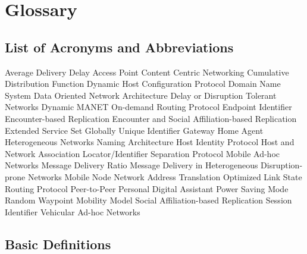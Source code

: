 \chapter{Glossary}

\section{List of Acronyms and Abbreviations}
\begin{description}

 {Average Delivery Delay}
 {Access Point}
 {Content Centric Networking}
 {Cumulative Distribution Function}
 {Dynamic Host Configuration Protocol}
 {Domain Name System}
 {Data Oriented Network Architecture}
 {Delay or Disruption Tolerant Networks}
 {Dynamic MANET On-demand Routing Protocol}
 {Endpoint Identifier}
 {Encounter-based Replication}
 {Encounter and Social Affiliation-based Replication}
 {Extended Service Set}
 {Globally Unique Identifier}
 {Gateway}
 {Home Agent}
 {Heterogeneous Networks Naming Architecture}
 {Host Identity Protocol}
 {Host and Network Association}
 {Locator/Identifier Separation Protocol}
 {Mobile Ad-hoc Networks}
 {Message Delivery Ratio}
 {Message Delivery in Heterogeneous Disruption-prone Networks}
 {Mobile Node}
 {Network Address Translation}
 {Optimized Link State Routing Protocol}
 {Peer-to-Peer}
 {Personal Digital Assistant}
 {Power Saving Mode}
 {Random Waypoint Mobility Model}
 {Social Affiliation-based Replication}
 {Session Identifier}
 {Vehicular Ad-hoc Networks}

\end{description}

\section{Basic Definitions}

